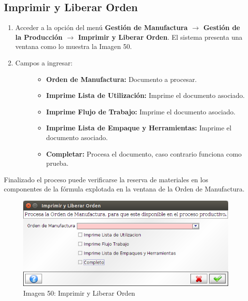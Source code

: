 \documentclass[letterpaper,10pt,spanish]{sphinxmanual}
\begin{document}
\subsection{Imprimir y Liberar Orden}
\label{manufactura-operaciones:imprimir-y-liberar-orden}\begin{enumerate}
\item {} 
Acceder a la opción del menú \textbf{Gestión de Manufactura \(\rightarrow\)  Gestión de la Producción \(\rightarrow\) Imprimir y Liberar Orden}. El sistema presenta una ventana como lo muestra la Imagen 50.

\item {} \begin{description}
\item[{Campos a ingresar:}] \leavevmode\begin{itemize}
\item {} 
\textbf{Orden de Manufactura:} Documento a procesar.

\item {} 
\textbf{Imprime Lista de Utilización:} Imprime el documento asociado.

\item {} 
\textbf{Imprime Flujo de Trabajo:} Imprime el documento asociado.

\item {} 
\textbf{Imprime Lista de Empaque y Herramientas:} Imprime el documento asociado.

\item {} 
\textbf{Completar:} Procesa el documento, caso contrario funciona como prueba.

\end{itemize}

\end{description}

\end{enumerate}

Finalizado el proceso puede verificarse la reserva de materiales en los componentes de la fórmula explotada en la ventana de la Orden de Manufactura.
\begin{figure}[htbp]
\centering
\capstart

\includegraphics{ly_imp&lib.png}
\caption{Imagen 50: Imprimir y Liberar Orden}\end{figure}
\end{document}
